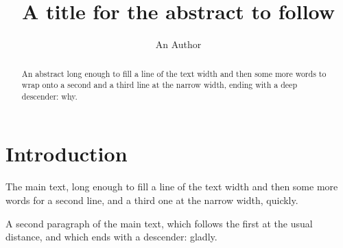 \documentclass{amsart}
\begin{document}
\title{A title for the abstract to follow}
\author{An Author}
\begin{abstract}
An abstract long enough to fill a line of the text width and then some more
words to wrap onto a second and a third line at the narrow width, ending
with a deep descender: why.
\end{abstract}
\maketitle
\thispagestyle{empty}
\section{Introduction}
The main text, long enough to fill a line of the text width and then some
more words for a second line, and a third one at the narrow width, quickly.

A second paragraph of the main text, which follows the first at the usual
distance, and which ends with a descender: gladly.
\end{document}
